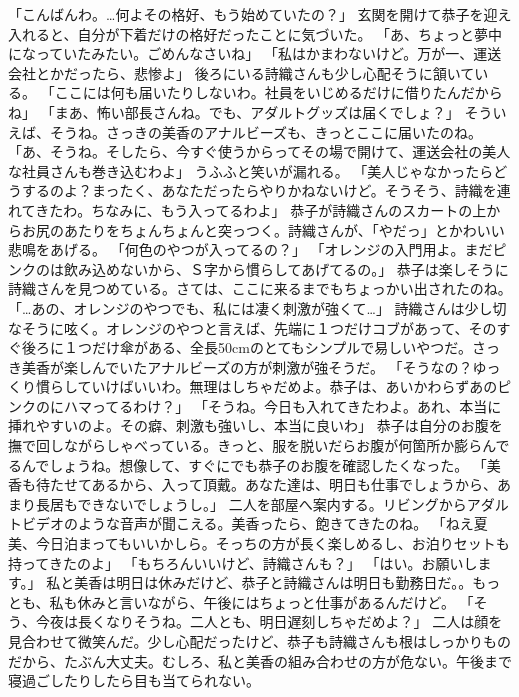 「こんばんわ。…何よその格好、もう始めていたの？」
玄関を開けて恭子を迎え入れると、自分が下着だけの格好だったことに気づいた。
「あ、ちょっと夢中になっていたみたい。ごめんなさいね」
「私はかまわないけど。万が一、運送会社とかだったら、悲惨よ」
後ろにいる詩織さんも少し心配そうに頷いている。
「ここには何も届いたりしないわ。社員をいじめるだけに借りたんだからね」
「まあ、怖い部長さんね。でも、アダルトグッズは届くでしょ？」
そういえば、そうね。さっきの美香のアナルビーズも、きっとここに届いたのね。
「あ、そうね。そしたら、今すぐ使うからってその場で開けて、運送会社の美人な社員さんも巻き込むわよ」
うふふと笑いが漏れる。
「美人じゃなかったらどうするのよ？まったく、あなただったらやりかねないけど。そうそう、詩織を連れてきたわ。ちなみに、もう入ってるわよ」
恭子が詩織さんのスカートの上からお尻のあたりをちょんちょんと突っつく。詩織さんが、「やだっ」とかわいい悲鳴をあげる。
「何色のやつが入ってるの？」
「オレンジの入門用よ。まだピンクのは飲み込めないから、Ｓ字から慣らしてあげてるの。」
恭子は楽しそうに詩織さんを見つめている。さては、ここに来るまでもちょっかい出されたのね。
「…あの、オレンジのやつでも、私には凄く刺激が強くて…」
詩織さんは少し切なそうに呟く。オレンジのやつと言えば、先端に１つだけコブがあって、そのすぐ後ろに１つだけ傘がある、全長50cmのとてもシンプルで易しいやつだ。さっき美香が楽しんでいたアナルビーズの方が刺激が強そうだ。
「そうなの？ゆっくり慣らしていけばいいわ。無理はしちゃだめよ。恭子は、あいかわらずあのピンクのにハマってるわけ？」
「そうね。今日も入れてきたわよ。あれ、本当に挿れやすいのよ。その癖、刺激も強いし、本当に良いわ」
恭子は自分のお腹を撫で回しながらしゃべっている。きっと、服を脱いだらお腹が何箇所か膨らんでるんでしょうね。想像して、すぐにでも恭子のお腹を確認したくなった。
「美香も待たせてあるから、入って頂戴。あなた達は、明日も仕事でしょうから、あまり長居もできないでしょうし。」
二人を部屋へ案内する。リビングからアダルトビデオのような音声が聞こえる。美香ったら、飽きてきたのね。
「ねえ夏美、今日泊まってもいいかしら。そっちの方が長く楽しめるし、お泊りセットも持ってきたのよ」
「もちろんいいけど、詩織さんも？」
「はい。お願いします。」
私と美香は明日は休みだけど、恭子と詩織さんは明日も勤務日だ。。もっとも、私も休みと言いながら、午後にはちょっと仕事があるんだけど。
「そう、今夜は長くなりそうね。二人とも、明日遅刻しちゃだめよ？」
二人は顔を見合わせて微笑んだ。少し心配だったけど、恭子も詩織さんも根はしっかりものだから、たぶん大丈夫。むしろ、私と美香の組み合わせの方が危ない。午後まで寝過ごしたりしたら目も当てられない。

